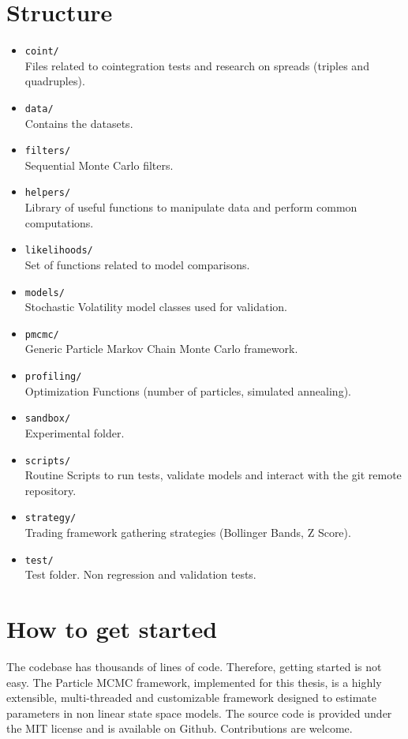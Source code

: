 \documentclass[11pt,a4,twosided,singlespacing,titlepagenumber=on]{scrreprt}
\numberwithin{equation}{chapter} %
\theoremstyle{remark}
\begin{document}
\section{Structure}

\begin{itemize}
\item \texttt{coint/} \\
Files related to cointegration tests and research on spreads (triples and quadruples).
\item \texttt{data/} \\
Contains the datasets.
\item \texttt{filters/} \\
Sequential Monte Carlo filters.
\item \texttt{helpers/} \\
Library of useful functions to manipulate data and perform common computations.
\item \texttt{likelihoods/} \\
Set of functions related to model comparisons.
\item \texttt{models/} \\
Stochastic Volatility model classes used for validation.
\item \texttt{pmcmc/} \\
Generic Particle Markov Chain Monte Carlo framework.
\item \texttt{profiling/} \\
Optimization Functions (number of particles, simulated annealing).
\item \texttt{sandbox/} \\
Experimental folder.
\item \texttt{scripts/} \\
Routine Scripts to run tests, validate models and interact with the git remote repository.
\item \texttt{strategy/} \\
Trading framework gathering strategies (Bollinger Bands, Z Score).
\item \texttt{test/} \\
Test folder. Non regression and validation tests.
\end{itemize}

\section{How to get started} 
The codebase has thousands of lines of code. Therefore, getting started is not easy.
The Particle MCMC framework, implemented for this thesis, is a highly extensible, multi-threaded and customizable framework designed to estimate parameters in non linear state space models. The source code is provided under the MIT license and is available on Github. Contributions are welcome. \\
\end{document}
